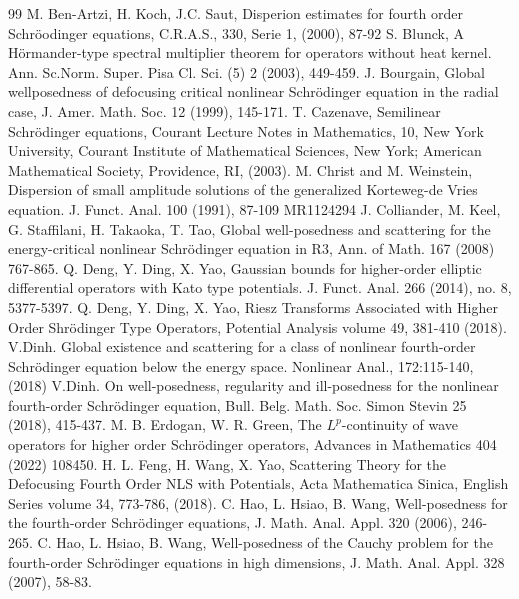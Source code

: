 \documentclass[11pt,a4paper]{article}
\numberwithin{equation}{section}
\begin{document}
\begin{thebibliography}{99}
M. Ben-Artzi, H. Koch, J.C. Saut, Disperion estimates for fourth order Schr\"{o}odinger
equations, C.R.A.S., 330, Serie 1, (2000), 87-92
S. Blunck, A H\"{o}rmander-type spectral multiplier theorem for operators without heat kernel. Ann. Sc.Norm. Super. Pisa Cl. Sci. (5) 2 (2003), 449-459.
J. Bourgain, Global wellposedness of defocusing critical nonlinear Schr\"{o}dinger equation in the radial case, J. Amer. Math. Soc. 12 (1999), 145-171.
T. Cazenave, Semilinear Schr\"{o}dinger equations, Courant Lecture Notes in Mathematics, 10, New York University, Courant Institute of Mathematical Sciences, New York; American Mathematical Society, Providence, RI, (2003).
M. Christ and M. Weinstein, Dispersion of small amplitude solutions of the generalized Korteweg-de Vries equation. J. Funct. Anal. 100  (1991), 87-109 MR1124294
J. Colliander, M. Keel, G. Staffilani, H. Takaoka, T. Tao, Global well-posedness and scattering for the energy-critical nonlinear Schr\"{o}dinger equation in R3, Ann. of Math. 167 (2008) 767-865.
Q. Deng, Y. Ding, X. Yao, Gaussian bounds for higher-order elliptic differential operators with Kato
type potentials. J. Funct. Anal. 266 (2014), no. 8, 5377-5397.
Q. Deng, Y. Ding, X. Yao, Riesz Transforms Associated with Higher Order Shr\"{o}dinger Type Operators, Potential Analysis volume 49, 381-410 (2018).
V.Dinh. Global existence and scattering for a class of nonlinear fourth-order Schr\"{o}dinger equation below the energy space. Nonlinear Anal., 172:115-140, (2018)
V.Dinh. On well-posedness, regularity and ill-posedness for the nonlinear fourth-order Schr\"{o}dinger equation, Bull. Belg. Math. Soc. Simon Stevin 25 (2018), 415-437.
M. B. Erdogan, W. R. Green, The $L^{p}$-continuity of wave operators for higher order Schr\"{o}dinger operators, Advances in Mathematics 404 (2022) 108450.
H. L. Feng, H. Wang, X. Yao, Scattering Theory for the Defocusing Fourth Order NLS with Potentials, Acta Mathematica Sinica, English Series volume 34, 773-786, (2018).
C. Hao, L. Hsiao, B. Wang, Well-posedness for the fourth-order Schr\"{o}dinger equations, J. Math. Anal. Appl. 320 (2006), 246-265.
C. Hao, L. Hsiao, B. Wang, Well-posedness of the Cauchy problem for the fourth-order Schr\"{o}dinger equations in high dimensions, J. Math. Anal. Appl. 328 (2007), 58-83.

\end{thebibliography}
\end{document}

